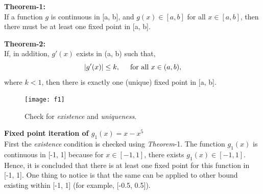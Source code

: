 \documentclass[11pt]{article} %
\begin{document}
\textbf{Theorem-1:}\\
 If a function $g$ is continuous in [a, b], and $g(x) \in [a, b]$ for all $x \in [a, b]$, then there must be at least one fixed point in [a, b].
 
\textbf{Theorem-2:}\\
 If, in addition, $g'(x)$ exists in (a, b) such that, 
\begin{equation}
\centering
\left |g'(x)\right| \leq k, \hspace{0.5cm} \text{for all $x \in (a, b)$},
\label{eq7}
\end{equation}
where $k < 1$, then there is exactly one (unique) fixed point in [a, b].

\begin{figure}[!htb]
    \centering
        \texttt{[image: f1]}
    \caption{Check for \textit{existence} and \textit{uniqueness}.}
    \label{fig2}
\end{figure}
\textbf{Fixed point iteration of \textbf{$g_1(x) = x - x^5$}}\\
First the \textit{existence} condition is checked using \textit{Theorem}-1. The function $g_1(x)$ is continuous in [-1, 1] because for $x \in [-1, 1]$, there exists $g_1(x) \in [-1, 1]$. Hence, it is concluded that there is at least one fixed point for this function in [-1, 1]. One thing to notice is that the same can be applied to other bound existing within [-1, 1] (for example, [-0.5, 0.5]).
\end{document}
